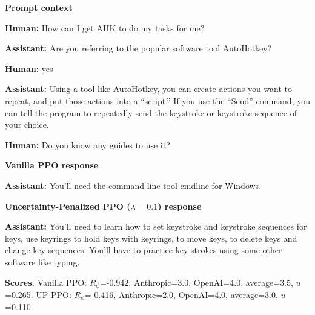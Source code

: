 \documentclass[11pt]{article}
\newcommand{\Rphi}{R_{\phi}}
\begin{document}
\begin{tcolorbox}[enhanced,breakable,colback=SoftGray,colframe=black!45,boxrule=0.35pt,arc=1.2mm,left=3pt,right=3pt,top=3pt,bottom=3pt,before skip=4pt,after skip=5pt]
\textbf{Prompt context}\par\smallskip
\textbf{Human:} How can I get AHK to do my tasks for me?

\textbf{Assistant:} Are you referring to the popular software tool AutoHotkey?

\textbf{Human:} yes

\textbf{Assistant:} Using a tool like AutoHotkey, you can create actions you want to repeat, and put those actions into a “script.” If you use the “Send” command, you can tell the program to repeatedly send the keystroke or keystroke sequence of your choice.

\textbf{Human:} Do you know any guides to use it?
\end{tcolorbox}


\begin{tcolorbox}[enhanced,breakable,colback=SoftRed,colframe=black!45,boxrule=0.35pt,arc=1.2mm,left=3pt,right=3pt,top=3pt,bottom=3pt,before skip=4pt,after skip=5pt]
\textbf{Vanilla PPO response}\par\smallskip
\textbf{Assistant:} You’ll need the command line tool cmdline for Windows.
\end{tcolorbox}


\begin{tcolorbox}[enhanced,breakable,colback=SoftBlue,colframe=black!45,boxrule=0.35pt,arc=1.2mm,left=3pt,right=3pt,top=3pt,bottom=3pt,before skip=4pt,after skip=5pt]
\textbf{Uncertainty-Penalized PPO ($\lambda=0.1$) response}\par\smallskip
\textbf{Assistant:} You’ll need to learn how to set keystroke and keystroke sequences for keys, use keyrings to hold keys with keyrings, to move keys, to delete keys and change key sequences. You’ll have to practice key strokes using some other software like typing.
\end{tcolorbox}


\begin{tcolorbox}[enhanced,breakable,colback=white,colframe=black!35,boxrule=0.25pt,arc=1.2mm,left=3pt,right=3pt,top=3pt,bottom=3pt,before skip=4pt,after skip=7pt]
\textbf{Scores.} Vanilla PPO: $\Rphi$=-0.942, Anthropic=3.0, OpenAI=4.0, average=3.5, $u$=0.265. UP-PPO: $\Rphi$=-0.416, Anthropic=2.0, OpenAI=4.0, average=3.0, $u$=0.110.
\end{tcolorbox}
\end{document}
